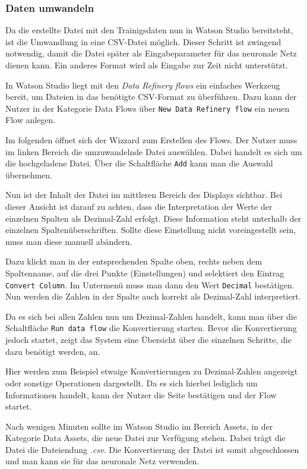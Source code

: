 \subsubsection{Daten umwandeln}
Da die erstellte Datei mit den Trainigsdaten nun in Watson Studio bereitsteht, ist die Umwandlung in eine CSV-Datei
möglich. Dieser Schritt ist zwingend notwendig, damit die Datei später als Eingabeparameter für das neuronale Netz
dienen kann. Ein anderes Format wird als Eingabe zur Zeit nicht unterstützt.

In Watson Studio liegt mit den \textit{Data Refinery flows} ein einfaches Werkzeug bereit, um Dateien in das benötigte
CSV-Format zu überführen. Dazu kann der Nutzer in der Kategorie Data Flows über \texttt{New Data Refinery flow} ein
neuen Flow anlegen.

Im folgenden öffnet sich der Wizzard zum Erstellen des Flows. Der Nutzer muss im linken Bereich die umzuwandelnde Datei
auswählen. Dabei handelt es sich um die hochgeladene Datei. Über die Schaltfläche \texttt{Add} kann man die Auswahl
übernehmen.

Nun ist der Inhalt der Datei im mittleren Bereich des Displays sichtbar. Bei dieser Ansicht ist darauf zu achten, dass
die Interpretation der Werte der einzelnen Spalten als Dezimal-Zahl erfolgt. Diese Information steht unterhalb der
einzelnen Spaltenüberschriften. Sollte diese Einstellung nicht voreingestellt sein, muss man diese manuell abändern.

Dazu klickt man in der entsprechenden Spalte oben, rechts neben dem Spaltenname, auf die drei Punkte (Einstellungen) und
selektiert den Eintrag \texttt{Convert Column}. Im Untermenü muss man dann den Wert \texttt{Decimal} bestätigen. Nun
werden die Zahlen in der Spalte auch korrekt als Dezimal-Zahl interpretiert.

Da es sich bei allen Zahlen nun um Dezimal-Zahlen handelt, kann man über die Schaltfläche \texttt{Run data flow} die
Konvertierung starten. Bevor die Konvertierung jedoch startet, zeigt das System eine Übersicht über die einzelnen
Schritte, die dazu benötigt werden, an.

Hier werden zum Beispiel etwaige Konvertierungen zu Dezimal-Zahlen angezeigt oder sonstige Operationen dargestellt. Da
es sich hierbei lediglich um Informationen handelt, kann der Nutzer die Seite bestätigen und der Flow startet.

Nach wenigen Minuten sollte im Watson Studio im Bereich Assets, in der Kategorie Data Assets, die neue Datei zur
Verfügung stehen. Dabei trägt die Datei die Dateiendung \textit{.csv}. Die Konvertierung der Datei ist somit
abgeschlossen und man kann sie für das neuronale Netz verwenden.

